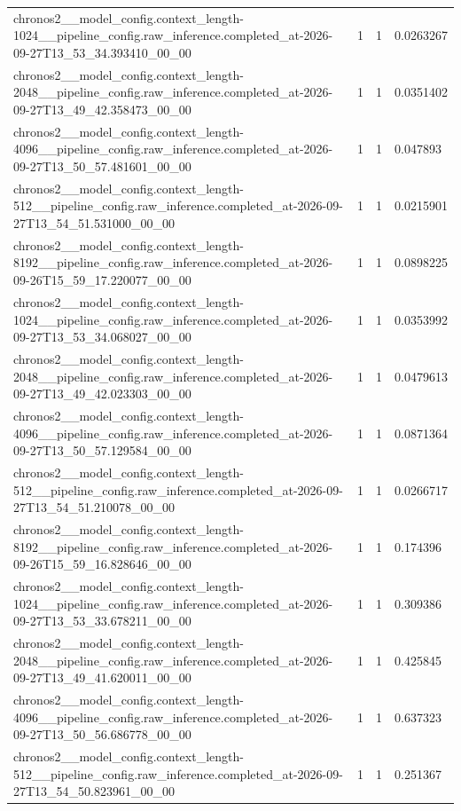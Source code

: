 \begin{tabular}{llll}
chronos2\_\_model\_config.context\_length-1024\_\_pipeline\_config.raw\_inference.completed\_at-2026-09-27T13\_53\_34.393410\_00\_00 & 1 & 1 & 0.0263267 \\
chronos2\_\_model\_config.context\_length-2048\_\_pipeline\_config.raw\_inference.completed\_at-2026-09-27T13\_49\_42.358473\_00\_00 & 1 & 1 & 0.0351402 \\
chronos2\_\_model\_config.context\_length-4096\_\_pipeline\_config.raw\_inference.completed\_at-2026-09-27T13\_50\_57.481601\_00\_00 & 1 & 1 & 0.047893 \\
chronos2\_\_model\_config.context\_length-512\_\_pipeline\_config.raw\_inference.completed\_at-2026-09-27T13\_54\_51.531000\_00\_00 & 1 & 1 & 0.0215901 \\
chronos2\_\_model\_config.context\_length-8192\_\_pipeline\_config.raw\_inference.completed\_at-2026-09-26T15\_59\_17.220077\_00\_00 & 1 & 1 & 0.0898225 \\
chronos2\_\_model\_config.context\_length-1024\_\_pipeline\_config.raw\_inference.completed\_at-2026-09-27T13\_53\_34.068027\_00\_00 & 1 & 1 & 0.0353992 \\
chronos2\_\_model\_config.context\_length-2048\_\_pipeline\_config.raw\_inference.completed\_at-2026-09-27T13\_49\_42.023303\_00\_00 & 1 & 1 & 0.0479613 \\
chronos2\_\_model\_config.context\_length-4096\_\_pipeline\_config.raw\_inference.completed\_at-2026-09-27T13\_50\_57.129584\_00\_00 & 1 & 1 & 0.0871364 \\
chronos2\_\_model\_config.context\_length-512\_\_pipeline\_config.raw\_inference.completed\_at-2026-09-27T13\_54\_51.210078\_00\_00 & 1 & 1 & 0.0266717 \\
chronos2\_\_model\_config.context\_length-8192\_\_pipeline\_config.raw\_inference.completed\_at-2026-09-26T15\_59\_16.828646\_00\_00 & 1 & 1 & 0.174396 \\
chronos2\_\_model\_config.context\_length-1024\_\_pipeline\_config.raw\_inference.completed\_at-2026-09-27T13\_53\_33.678211\_00\_00 & 1 & 1 & 0.309386 \\
chronos2\_\_model\_config.context\_length-2048\_\_pipeline\_config.raw\_inference.completed\_at-2026-09-27T13\_49\_41.620011\_00\_00 & 1 & 1 & 0.425845 \\
chronos2\_\_model\_config.context\_length-4096\_\_pipeline\_config.raw\_inference.completed\_at-2026-09-27T13\_50\_56.686778\_00\_00 & 1 & 1 & 0.637323 \\
chronos2\_\_model\_config.context\_length-512\_\_pipeline\_config.raw\_inference.completed\_at-2026-09-27T13\_54\_50.823961\_00\_00 & 1 & 1 & 0.251367 \\

\end{tabular}
